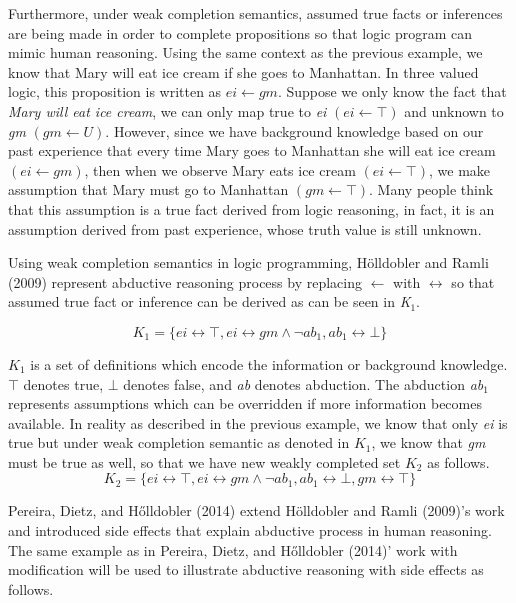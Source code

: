 \documentclass[]{interact}
\theoremstyle{plain}%
\theoremstyle{definition}
\theoremstyle{remark}
\begin{document}
Furthermore, under weak completion semantics, assumed true facts or inferences are being made in order to complete propositions so that logic program can mimic human reasoning. Using the same context as the previous example, we know that Mary will eat ice cream if she goes to Manhattan. In three valued logic, this proposition is written as \( ei \leftarrow gm \). Suppose we only know the fact that \textit{Mary will eat ice cream}, we can only map true to \textit{ei} \( (ei \gets \top) \) and unknown to \textit{gm} \( (gm \gets U). \) However, since we have background knowledge based on our past experience that every time Mary goes to Manhattan she will eat ice cream \( (ei \gets gm) \), then when we observe Mary eats ice cream \( (ei \gets \top) \), we make assumption that Mary must go to Manhattan \( (gm \gets \top) \). Many people think that this assumption is a true fact derived from logic reasoning, in fact, it is an assumption derived from past experience, whose truth value is still unknown.

Using weak completion semantics in logic programming, Hölldobler and Ramli (2009) represent abductive reasoning process by replacing \( \gets \) with \( \leftrightarrow \) so that assumed true fact or inference can be derived as can be seen in \textit{K}$_{1}$.

\[ K_{1} = \{ ei \leftrightarrow \top, ei \leftrightarrow gm \wedge \neg ab_1,  ab_1 \leftrightarrow \bot \} \]

\( K_{1} \) is a set of definitions which encode the information or background knowledge.  \( \top \) denotes true, \( \bot \) denotes false, and \textit{ab} denotes abduction. The abduction \textit{ab}$_{1}$ represents assumptions which can be overridden if more information becomes available. In reality as described in the previous example, we know that only \textit{ei} is true but under weak completion semantic as denoted in \(K_{1}\), we know that \textit{gm} must be true as well, so that we have new weakly completed set \(K_{2}\) as follows.
\[ K_{2} = \{ ei \leftrightarrow \top, ei \leftrightarrow gm \wedge \neg ab_1,  ab_1 \leftrightarrow \bot, gm \leftrightarrow \top \} \]

Pereira, Dietz, and Hőlldobler (2014) extend Hölldobler and Ramli (2009)’s work and introduced side effects that explain abductive process in human reasoning. The same example as in Pereira, Dietz, and Hőlldobler (2014)’ work with modification will be used to illustrate abductive reasoning with side effects as follows.
\end{document}
